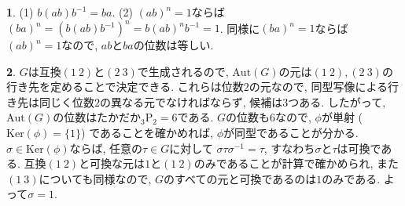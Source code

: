 \documentclass{article}
\theoremstyle{definition}
\newtheorem{ans}{}
\numberwithin{ans}{subsection}
\newcommand{\Ker}[1]{\mathrm{Ker}(#1)}
\begin{document}
\begin{ans}
  (1) $b(ab)b^{-1} = ba$.
  (2) $(ab)^n = 1$ならば$(ba)^n = (b(ab)b^{-1})^n = b(ab)^nb^{-1} = 1$.
  同様に$(ba)^n = 1$ならば$(ab)^n = 1$なので, $ab$と$ba$の位数は等しい.
\end{ans}

\begin{ans}
  $G$は互換$(1\ 2)$と$(2\ 3)$で生成されるので,
  $\mathrm{Aut}(G)$の元は$(1\ 2), (2\ 3)$の行き先を定めることで決定できる.
  これらは位数$2$の元なので, 同型写像による行き先は同じく位数$2$の異なる元でなければならず, 候補は$3$つある.
  したがって, $\mathrm{Aut}(G)$の位数はたかだか${}_3 \mathrm{P}_2 = 6$である.
  $G$の位数も$6$なので, $\phi$が単射 ($\Ker{\phi} = \{1\}$) であることを確かめれば, $\phi$が同型であることが分かる.
  $\sigma \in \Ker{\phi}$ならば, 任意の$\tau \in G$に対して
  $\sigma \tau \sigma^{-1} = \tau$, すなわち$\sigma$と$\tau$は可換である.
  互換$(1\ 2)$と可換な元は$1$と$(1\ 2)$のみであることが計算で確かめられ,
  また$(1\ 3)$についても同様なので, $G$のすべての元と可換であるのは$1$のみである.
  よって$\sigma = 1$.
\end{ans}
\end{document}
